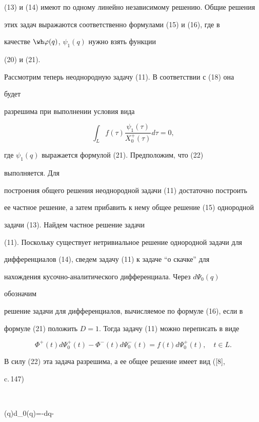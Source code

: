 (13) и (14) имеют по одному линейно независимому решению. Общие решения 


этих задач выражаются соответственно формулами (15) и (16), где в 


качестве $\wh\varphi(q)$, $\psi_1(q)$ нужно взять функции


(20) и (21). 


 


Рассмотрим теперь неоднородную задачу (11). В соответствии с (18) она 


будет 


разрешима при выполнении условия вида 


\begin{equation} 


\int_L f(\tau)\frac{\psi_1(\tau)}{X^+_0(\tau)}d\tau=0, 


\end{equation} 


где $\psi_1(q)$ выражается формулой (21). Предположим, что (22) 


выполняется. Для 


построения общего решения неоднородной задачи (11) достаточно построить 


ее частное решение, а затем прибавить к нему общее решение (15) однородной 


задачи (13). Найдем частное решение задачи 


(11). Поскольку существует нетривиальное решение однородной задачи для 


дифференциалов (14), сведем задачу (11) к задаче ``о скачке'' для 


нахождения кусочно-аналитического дифференциала. Через $d\Psi_0(q)$ 


обозначим 


решение задачи для дифференциалов, вычисляемое по формуле (16), если в 


формуле (21) положить $D=1$. Тогда задачу (11) можно переписать в виде 


$$ 


\Phi^+(t)d\Psi^+_0(t)-\Phi^-(t)d\Psi^-_0(t)= 


f(t)d\Psi^+_0(t),\quad t\in L. 


$$ 


В силу (22) эта задача разрешима, а ее общее решение имеет вид ([8], 


c.\,147)


$$ 


\Phi(q)d\Psi_0(q)=-dq- 


